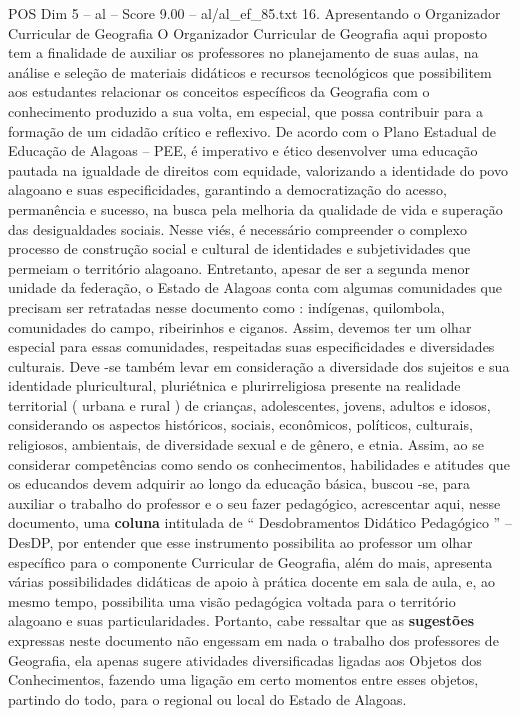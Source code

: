 \begin{textsample}{POS Dim 5 – al – Score 9.00 – al/al\_ef\_85.txt}  \label{ex:f5_pos_045}
16.
Apresentando o Organizador Curricular de Geografia O Organizador Curricular de Geografia aqui proposto tem a finalidade de auxiliar os professores no planejamento de suas aulas, na análise e seleção de materiais didáticos e recursos tecnológicos que possibilitem aos estudantes relacionar os conceitos específicos da Geografia com o conhecimento produzido a sua volta, em especial, que possa contribuir para a formação de um cidadão crítico e reflexivo.
De acordo com o Plano Estadual de Educação de Alagoas – PEE, é imperativo e ético desenvolver uma educação pautada na igualdade de direitos com equidade, valorizando a identidade do povo alagoano e suas especificidades, garantindo a democratização do acesso, permanência e sucesso, na busca pela melhoria da qualidade de vida e superação das desigualdades sociais.
Nesse viés, é necessário compreender o complexo processo de construção social e cultural de identidades e subjetividades que permeiam o território alagoano.
Entretanto, apesar de ser a segunda menor unidade da federação, o Estado de Alagoas conta com algumas comunidades que precisam ser retratadas nesse documento como : indígenas, quilombola, comunidades do campo, ribeirinhos e ciganos.
Assim, devemos ter um olhar especial para essas comunidades, respeitadas suas especificidades e diversidades culturais.
Deve -se também levar em consideração a diversidade dos sujeitos e sua identidade pluricultural, pluriétnica e plurirreligiosa presente na realidade territorial ( urbana e rural ) de crianças, adolescentes, jovens, adultos e idosos, considerando os aspectos históricos, sociais, econômicos, políticos, culturais, religiosos, ambientais, de diversidade sexual e de gênero, e etnia.
Assim, ao se considerar competências como sendo os conhecimentos, habilidades e atitudes que os educandos devem adquirir ao longo da educação básica, buscou -se, para auxiliar o trabalho do professor e o seu fazer pedagógico, acrescentar aqui, nesse documento, uma \textbf{coluna} intitulada de “ Desdobramentos Didático Pedagógico ” – DesDP, por entender que esse instrumento possibilita ao professor um olhar específico para o componente Curricular de Geografia, além do mais, apresenta várias possibilidades didáticas de apoio à prática docente em sala de aula, e, ao mesmo tempo, possibilita uma visão pedagógica voltada para o território alagoano e suas particularidades.
Portanto, cabe ressaltar que as \textbf{sugestões} expressas neste documento não engessam em nada o trabalho dos professores de Geografia, ela apenas sugere atividades diversificadas ligadas aos Objetos dos Conhecimentos, fazendo uma ligação em certo momentos entre esses objetos, partindo do todo, para o regional ou local do Estado de Alagoas.

\end{textsample}
